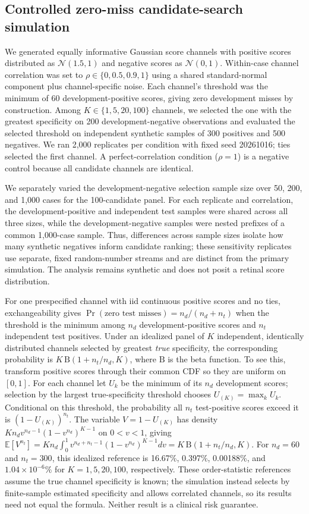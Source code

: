 \documentclass[11pt]{article}
\begin{document}
\subsection{Controlled zero-miss candidate-search simulation}
We generated equally informative Gaussian score channels with positive scores distributed as $\mathcal{N}(1.5,1)$ and negative scores as $\mathcal{N}(0,1)$. Within-case channel correlation was set to $\rho\in\{0,0.5,0.9,1\}$ using a shared standard-normal component plus channel-specific noise. Each channel's threshold was the minimum of 60 development-positive scores, giving zero development misses by construction. Among $K\in\{1,5,20,100\}$ channels, we selected the one with the greatest specificity on 200 development-negative observations and evaluated the selected threshold on independent synthetic samples of 300 positives and 500 negatives. We ran 2,000 replicates per condition with fixed seed 20261016; ties selected the first channel. A perfect-correlation condition ($\rho=1$) is a negative control because all candidate channels are identical.

We separately varied the development-negative selection sample size over 50, 200, and 1,000 cases for the 100-candidate panel. For each replicate and correlation, the development-positive and independent test samples were shared across all three sizes, while the development-negative samples were nested prefixes of a common 1,000-case sample. Thus, differences across sample sizes isolate how many synthetic negatives inform candidate ranking; these sensitivity replicates use separate, fixed random-number streams and are distinct from the primary simulation. The analysis remains synthetic and does not posit a retinal score distribution.

For one prespecified channel with iid continuous positive scores and no ties, exchangeability gives $\Pr(\text{zero test misses})=n_d/(n_d+n_t)$ when the threshold is the minimum among $n_d$ development-positive scores and $n_t$ independent test positives. Under an idealized panel of $K$ independent, identically distributed channels selected by greatest \emph{true} specificity, the corresponding probability is $K\,\mathrm{B}(1+n_t/n_d,K)$, where $\mathrm{B}$ is the beta function. To see this, transform positive scores through their common CDF so they are uniform on $[0,1]$. For each channel let $U_k$ be the minimum of its $n_d$ development scores; selection by the largest true-specificity threshold chooses $U_{(K)}=\max_k U_k$. Conditional on this threshold, the probability all $n_t$ test-positive scores exceed it is $(1-U_{(K)})^{n_t}$. The variable $V=1-U_{(K)}$ has density $K n_d v^{n_d-1}(1-v^{n_d})^{K-1}$ on $0<v<1$, giving $\mathbb{E}[V^{n_t}]=K n_d\int_0^1v^{n_d+n_t-1}(1-v^{n_d})^{K-1}dv=K\,\mathrm{B}(1+n_t/n_d,K)$. For $n_d=60$ and $n_t=300$, this idealized reference is 16.67\%, 0.397\%, 0.00188\%, and $1.04\times10^{-6}\%$ for $K=1,5,20,100$, respectively. These order-statistic references assume the true channel specificity is known; the simulation instead selects by finite-sample estimated specificity and allows correlated channels, so its results need not equal the formula. Neither result is a clinical risk guarantee.
\end{document}
